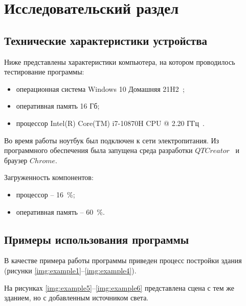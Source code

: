\chapter{Исследовательский раздел}

\section{Технические характеристики устройства}

Ниже представлены характеристики компьютера, на котором проводилось тестирование программы:

\begin{itemize}[label=---]
    \item операционная система Windows 10 Домашняя 21H2~\cite{windows};
    \item оперативная память 16 Гб;
    \item процессор Intel(R) Core(TM) i7-10870H CPU @ 2.20 ГГц~\cite{intel}.
\end{itemize}

Во время работы ноутбук был подключен к сети электропитания. Из программного обеспечения была запущена среда разработки $QT Creator$~\cite{qt} и браузер $Chrome$.

Загруженность компонентов:

\begin{itemize}[label=---]
    \item процессор -- 16~\%;
    \item оперативная память -- 60~\%.
\end{itemize}

\section{Примеры использования программы}

В качестве примера работы программы приведен процесс постройки здания (рисунки \ref{img:example1}--\ref{img:example4}).

\clearpage

На рисунках \ref{img:example5}--\ref{img:example6} представлена сцена с тем же зданием, но с добавленным источником света.

\clearpage

